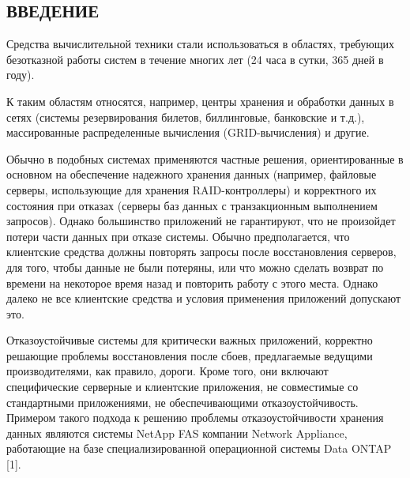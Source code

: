 \begin{multicols}{2}

\section*{ВВЕДЕНИЕ}

Средства вычислительной техники стали использоваться в областях,
требующих безотказной работы систем в течение многих лет (24 часа
в сутки, 365 дней в году).

\label{st\stat}


К таким областям относятся, например, центры хранения и обработки данных  в сетях (системы резервирования билетов, биллинговые,  банковские и т.д.), массированные распределенные вычисления (GRID-вычисления) и другие.

\thispagestyle{headings}

Обычно в подобных системах применяются частные решения, ориентированные в основном на обеспечение надежного хранения данных (например, файловые серверы, использующие для хранения RAID-контроллеры) и корректного их состояния при отказах (серверы баз данных с транзакционным выполнением запросов). Однако большинство приложений не гарантируют, что не произойдет потери части данных при отказе системы. Обычно предполагается, что клиентские средства должны повторять запросы после восстановления серверов, для того, чтобы данные не были потеряны, или что можно сделать возврат по времени на некоторое время назад и повторить работу с этого места. Однако далеко не все клиентские средства и условия применения приложений допускают это.

Отказоустойчивые системы для критически важных приложений, корректно решающие проблемы восстановления после сбоев,   предлагаемые ведущими производителями, как правило, дороги. Кроме того, они включают специфические серверные и клиентские приложения, не совместимые со стандартными приложениями, не обеспечивающими отказоустойчивость. Примером такого подхода к решению проблемы отказоустойчивости  хранения данных являются системы NetApp FAS компании Network Appliance, работающие на базе специализированной операционной системы Data ONTAP [1].


\end{multicols}
